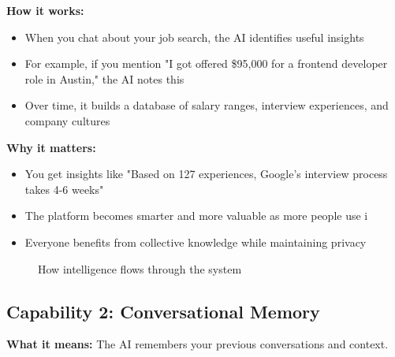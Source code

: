 \documentclass[12pt,a4paper]{article}
\begin{document}
\textbf{How it works:}
\begin{itemize}
  \item When you chat about your job search, the AI identifies useful insights
  \item For example, if you mention "I got offered \$95,000 for a frontend developer role in Austin," the AI notes this
  \item Over time, it builds a database of salary ranges, interview experiences, and company cultures
\end{itemize}

\textbf{Why it matters:}
\begin{itemize}
  \item You get insights like "Based on 127 experiences, Google's interview process takes 4-6 weeks"
  \item The platform becomes smarter and more valuable as more people use i
  \item Everyone benefits from collective knowledge while maintaining privacy
\end{itemize}

\begin{figure}[h]
\centering
{}
\caption{How intelligence flows through the system}
\end{figure}

\subsection{Capability 2: Conversational Memory}

\textbf{What it means:} The AI remembers your previous conversations and context.
\end{document}
